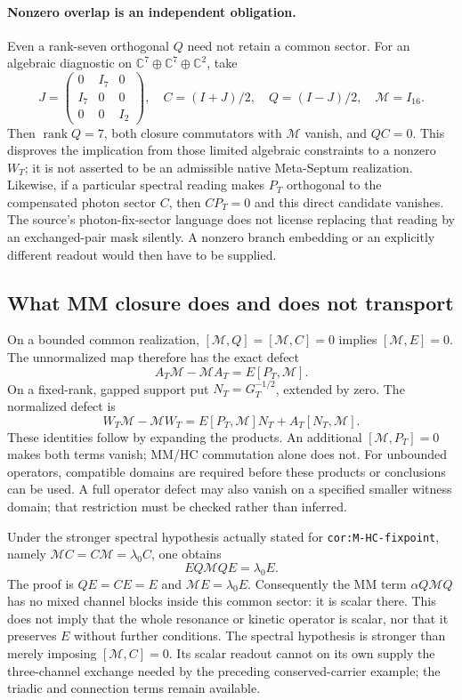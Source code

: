 \documentclass[11pt,a4paper]{article}
\begin{document}
\paragraph{Nonzero overlap is an independent obligation.}
Even a rank-seven orthogonal $Q$ need not retain a common sector.
For an algebraic diagnostic on $\mathbb C^{7}\oplus\mathbb C^{7}
\oplus\mathbb C^2$, take
\[
 J=\begin{pmatrix}0&I_7&0\\I_7&0&0\\0&0&I_2\end{pmatrix},
 \quad C=(I+J)/2,\quad Q=(I-J)/2,\quad \mathcal M=I_{16}.
\]
Then $\operatorname{rank}Q=7$, both closure commutators with
$\mathcal M$ vanish, and $QC=0$. This disproves the implication from
those limited algebraic constraints to a nonzero $W_T$; it is not
asserted to be an admissible native Meta-Septum realization.
Likewise, if a particular spectral reading makes $P_T$ orthogonal
to the compensated photon sector $C$, then $CP_T=0$ and this direct
candidate vanishes. The source's photon-fix-sector language does not
license replacing that reading by an exchanged-pair mask silently.
A nonzero branch embedding or an explicitly different readout would
then have to be supplied.

\subsection{What MM closure does and does not transport}

On a bounded common realization, $[\mathcal M,Q]=[\mathcal M,C]=0$
implies $[\mathcal M,E]=0$. The unnormalized map therefore has the
exact defect
\[
 A_T\mathcal M-\mathcal M A_T=E[P_T,\mathcal M].
\]
On a fixed-rank, gapped support put $N_T=G_T^{-1/2}$, extended by
zero. The normalized defect is
\[
 W_T\mathcal M-\mathcal M W_T
 =E[P_T,\mathcal M]N_T+A_T[N_T,\mathcal M].
\]
These identities follow by expanding the products. An additional
$[\mathcal M,P_T]=0$ makes both terms vanish; MM/HC commutation
alone does not. For unbounded operators, compatible domains are
required before these products or conclusions can be used. A full
operator defect may also vanish on a specified smaller witness
domain; that restriction must be checked rather than inferred.

Under the stronger spectral hypothesis actually stated for
\texttt{cor:M-HC-fixpoint}, namely
$\mathcal M C=C\mathcal M=\lambda_0C$, one obtains
\[
 E Q\mathcal M Q E=\lambda_0 E.
\]
The proof is $QE=CE=E$ and $\mathcal ME=\lambda_0E$.
Consequently the MM term $\alpha Q\mathcal M Q$ has no mixed
channel blocks inside this common sector: it is scalar there.
This does not imply that the whole resonance or kinetic operator is
scalar, nor that it preserves $E$ without further conditions.
The spectral hypothesis is stronger than merely imposing
$[\mathcal M,C]=0$. Its scalar readout cannot on its own supply the
three-channel exchange needed by the preceding conserved-carrier
example; the triadic and connection terms remain available.
\end{document}
